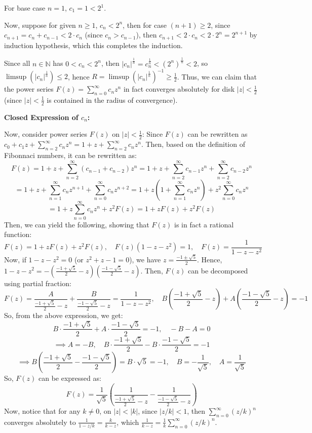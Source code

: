\documentclass{article}
\begin{document}
For base case $n=1$, $c_1=1<2^1$.

Now, suppose for given $n\geq 1$, $c_n<2^n$, then for case $(n+1)\geq 2$, since $c_{n+1}=c_n+c_{n-1} < 2\cdot c_n$ (since $c_{n}>c_{n-1}$), then $c_{n+1}<2\cdot c_n<2\cdot 2^n=2^{n+1}$
by induction hypothesis, which this completes the induction.

Since all $n\in\mathbb{N}$ has $0<c_n<2^n$, then $|c_n|^{\frac{1}{n}}=c_n^{\frac{1}{n}}<(2^n)^{\frac{1}{n}}<2$, so $\limsup(|c_n|^{\frac{1}{n}})\leq 2$, hence $R=\limsup(|c_n|^{\frac{1}{n}})^{-1}\geq\frac{1}{2}$.
Thus, we can claim that the power series $F(z)=\sum_{n=0}^{\infty}c_nz^n$ in fact converges absolutely for disk $|z|<\frac{1}{2}$ (since $|z|<\frac{1}{2}$ is contained in the radius of convergence).

\hfil

\textbf{Closed Expression of $c_n$:}

Now, consider power series $F(z)$ on $|z|<\frac{1}{2}$: Since $F(z)$ can be rewritten as $c_0+c_1z+\sum_{n=2}^{\infty}c_nz^n = 1+z+\sum_{n=2}^{\infty}c_nz^n$.
Then, based on the definition of Fibonnaci numbers, it can be rewritten as:
$$F(z)=1+z+\sum_{n=2}^{\infty}(c_{n-1}+c_{n-2})z^n = 1+z+\sum_{n=2}^{\infty}c_{n-1}z^n+\sum_{n=2}^{\infty}c_{n-2}z^n$$
$$ = 1+z+\sum_{n=1}^{\infty}c_nz^{n+1}+\sum_{n=0}^{\infty}c_nz^{n+2} = 1+z\left(1+\sum_{n=1}^{\infty}c_nz^n\right)+z^2\sum_{n=0}^{\infty}c_nz^n$$
$$=1+z\sum_{n=0}^{\infty}c_nz^n+z^2F(z) = 1+zF(z)+z^2F(z)$$
Then, we can yield the following, showing that $F(z)$ is in fact a rational function:
$$F(z)=1+zF(z)+z^2F(z),\quad F(z)(1-z-z^2)=1,\quad F(z)=\frac{1}{1-z-z^2}$$
Now, if $1-z-z^2=0$ (or $z^2+z-1=0$), we have $z=\frac{-1\pm\sqrt{5}}{2}$. Hence, $1-z-z^2=-\left(\frac{-1+\sqrt{5}}{2}-z\right)\left(\frac{-1-\sqrt{5}}{2}-z\right)$.
Then, $F(z)$ can be decomposed using partial fraction:
$$F(z)=\frac{A}{\frac{-1+\sqrt{5}}{2}-z}+\frac{B}{\frac{-1-\sqrt{5}}{2}-z}=\frac{1}{1-z-z^2},\quad B\left(\frac{-1+\sqrt{5}}{2}-z\right)+A\left(\frac{-1-\sqrt{5}}{2}-z\right)=-1$$
So, from the above expression, we get:
$$B\cdot\frac{-1+\sqrt{5}}{2}+A\cdot \frac{-1-\sqrt{5}}{2}=-1,\quad -B-A=0$$
$$\implies A=-B,\quad B\cdot\frac{-1+\sqrt{5}}{2}-B\cdot \frac{-1-\sqrt{5}}{2}=-1$$
$$\implies B\left(\frac{-1+\sqrt{5}}{2}-\frac{-1-\sqrt{5}}{2}\right)=B\cdot \sqrt{5}=-1,\quad B=-\frac{1}{\sqrt{5}},\quad A=\frac{1}{\sqrt{5}}$$
So, $F(z)$ can be expressed as:
$$F(z)=\frac{1}{\sqrt{5}}\left(\frac{1}{\frac{-1+\sqrt{5}}{2}-z}-\frac{1}{\frac{-1-\sqrt{5}}{2}-z}\right)$$
Now, notice that for any $k\neq 0$, on $|z|<|k|$, since $|z/k|<1$, then $\sum_{n=0}^{\infty}(z/k)^n$ converges absolutely to $\frac{1}{1-z/k} = \frac{k}{k-z}$, which $\frac{1}{k-z}=\frac{1}{k}\sum_{n=0}^{\infty}(z/k)^n$.
\end{document}
